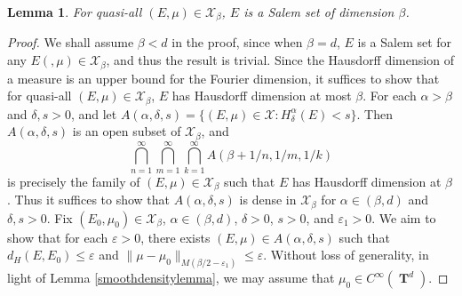 \documentclass[12pt,reqno]{article}
\numberwithin{equation}{section}
\DeclareMathOperator{\hausdim}{\dim_{\mathbf{H}}}
\DeclareMathOperator{\fordim}{\dim_{\mathbf{F}}}
\DeclareMathOperator{\TT}{\mathbf{T}}
\newtheorem{lemma}{Lemma}
\begin{document}
\begin{lemma}
    For quasi-all $(E,\mu) \in \mathcal{X}_\beta$, $E$ is a Salem set of dimension $\beta$.
\end{lemma}
\begin{proof}
    We shall assume $\beta < d$ in the proof, since when $\beta = d$, $E$ is a Salem set for any $E(,\mu) \in \mathcal{X}_\beta$, and thus the result is trivial. Since the Hausdorff dimension of a measure is an upper bound for the Fourier dimension, it suffices to show that for quasi-all $(E,\mu) \in \mathcal{X}_\beta$, $E$ has Hausdorff dimension at most $\beta$. For each $\alpha > \beta$ and $\delta, s > 0$, and let $A(\alpha,\delta,s) = \{ (E,\mu) \in \mathcal{X}: H^\alpha_\delta(E) < s \}$. Then $A(\alpha,\delta,s)$ is an open subset of $\mathcal{X}_\beta$, and
    \[ \bigcap_{n = 1}^\infty \bigcap_{m = 1}^\infty \bigcap_{k = 1}^\infty A(\beta + 1/n, 1/m, 1/k) \]
    is precisely the family of $(E,\mu) \in \mathcal{X}_\beta$ such that $E$ has Hausdorff dimension at $\beta$.
%
    Thus it suffices to show that $A(\alpha,\delta,s)$ is dense in $\mathcal{X}_\beta$ for $\alpha \in (\beta,d)$ and $\delta, s > 0$. Fix $(E_0,\mu_0) \in \mathcal{X}_\beta$, $\alpha \in (\beta,d)$, $\delta > 0$, $s > 0$, and $\varepsilon_1 > 0$. We aim to show that for each $\varepsilon > 0$, there exists $(E,\mu) \in A(\alpha,\delta,s)$ such that $d_H(E,E_0) \leq \varepsilon$ and $\| \mu - \mu_0 \|_{M(\beta/2 - \varepsilon_1)} \leq \varepsilon$. Without loss of generality, in light of Lemma \ref{smoothdensitylemma}, we may assume that $\mu_0 \in C^\infty(\TT^d)$.


\end{proof}
\end{document}
